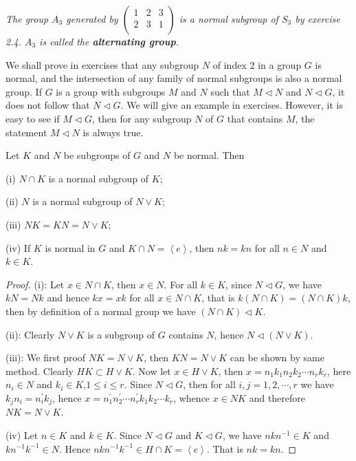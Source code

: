 \begin{example}\em
The group $A_3$ generated by $
\left( \begin{matrix}
	1&		2&		3\\
	2&		3&		1\\
\end{matrix} \right) 
$ is a normal subgroup of $S_3$ by exercise 2.4. $A_3$ is called the \textbf{alternating group}.
\end{example}
We shall prove in exercises that any subgroup $N$ of index $2$ in a group $G$ is normal, and the intersection of any family of normal subgroups is also a normal group. If $G$ is a group with subgroups $M$ and $N$ such that $M\lhd N$ and $N\lhd G$, it does not follow that $N\lhd G$. We will give an example in exercises. However, it is easy to see if $M\lhd G$, then for any subgroup $N$ of $G$ that contains $M$, the statement $M\lhd N$ is always true.
\begin{theorem}
Let $K$ and $N$ be subgroups of $G$ and $N$ be normal. Then\par
(i) $N\cap K$ is a normal subgroup of $K$;\par
(ii) $N$ is a normal subgroup of $N\vee K$;\par
(iii) $NK=KN=N\vee K$;\par
(iv) If $K$ is normal in $G$ and $K\cap N=\left<e\right>$, then $nk=kn$ for all $n\in N$ and $k\in K$.
\end{theorem}
\begin{proof}
(i): Let $x\in N\cap K$, then $x\in N$. For all $k\in K$, since $N\lhd G$, we have $kN=Nk$ and hence $kx=xk$ for all $x\in N\cap K$, that is $k(N\cap K)=(N\cap K)k$, then by definition of a normal group we have $(N\cap K)\lhd K$.\par
(ii): Clearly $N\vee K$ is a subgroup of $G$ contains $N$, hence $N\lhd(N\vee K)$.\par
(iii): We first proof $NK=N\vee K$, then $KN=N\vee K$ can be shown by same method. Clearly $HK\subset H\vee K$. Now let $x\in H\vee K$, then $x=n_1k_1n_2k_2\cdots n_rk_r$, here $n_i\in N$ and $k_i\in K$,$1\le i\le r$. Since $N\lhd G$, then for all $i,j=1,2,\cdots,r$ we have$k_jn_i=n_i^\prime k_j$, hence $x=n_1^\prime n_2^\prime\cdots n_r^\prime k_1k_2\cdots k_r$, whence $x\in NK$ and therefore $NK=N\vee K$.\par
(iv) Let $n\in K$ and $k\in K$. Since $N\lhd G$ and $K\lhd G$, we have $nkn^{-1}\in K$ and $kn^{-1}k^{-1}\in N$. Hence $nkn^{-1}k^{-1}\in H\cap K=\left<e\right>$. That is $nk=kn$.
\end{proof}
